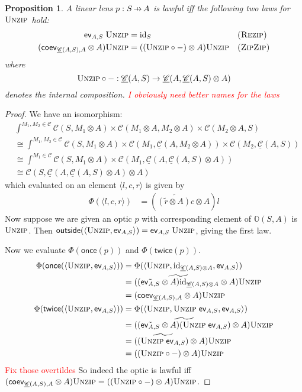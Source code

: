 \documentclass[11pt,a4paper]{article}
\theoremstyle{plain}
\newtheorem{proposition}[theorem]{Proposition}
\theoremstyle{definition}
\newcommand{\C}{\mathscr{C}}
\newcommand{\homC}{\underline{\C}}
\newcommand{\id}{\mathrm{id}}
\newcommand{\funzip}{\textsc{Unzip}}
\newcommand{\outside}{\mathsf{outside}}
\newcommand{\once}{\mathsf{once}}
\newcommand{\twice}{\mathsf{twice}}
\newcommand{\hto}{\ensuremath{\,\mathaccent\shortmid\rightarrow\,}}
\newcommand{\todo}[1]{\textcolor{red}{\small #1}}
\begin{document}
\begin{proposition}
  A linear lens $p : S \hto A$ is lawful iff the following two laws for $\funzip$ hold:
  \begin{align*}
    \ev_{A, S} \; \funzip &= \id_S && \textsc{(Rezip)} \\
    (\coev_{\homC(A, S), A} \otimes A)\funzip &= ((\funzip \circ -) \otimes A)\funzip && \textsc{(ZipZip)}
  \end{align*}
  where \[ \funzip \circ - : \homC(A, S) \to \homC(A, \homC(A, S) \otimes A) \] denotes the internal composition. \todo{I obviously need better names for the laws}
\end{proposition}
\begin{proof}
  We have an isomorphism:
  \begin{align*}
    & \int^{M_1, M_2 \in \C} \C(S, M_1 \otimes A) \times \C(M_1 \otimes A, M_2 \otimes A) \times \C(M_2 \otimes A, S) \\
    &\cong \int^{M_1, M_2 \in \C} \C(S, M_1 \otimes A) \times \C(M_1, \homC(A, M_2 \otimes A)) \times \C(M_2, \homC(A, S)) \\
    &\cong \int^{M_1 \in \C} \C(S, M_1 \otimes A) \times \C(M_1, \homC(A, \homC(A, S) \otimes A)) \\
    &\cong \C(S, \homC(A, \homC(A, S) \otimes A) \otimes A)
  \end{align*}
  which evaluated on an element $\langle l, c, r \rangle$ is given by
  \begin{align*}
    \Phi(\langle l, c, r \rangle) &= (\widetilde{(\tilde{r} \otimes A)c} \otimes A)l
  \end{align*}
  Now suppose we are given an optic $p$ with corresponding element of $\mathbb{O}(S, A)$ is $\funzip$. Then $\outside(\langle \funzip , \ev_{A, S} \rangle) = \ev_{A, S} \; \funzip$, giving the first law.

  Now we evaluate $\Phi(\once(p))$ and $\Phi(\twice(p))$.
  \begin{align*}
    \Phi(\once(\langle \funzip , \ev_{A, S} \rangle))
    &= \Phi(\langle \funzip , \id_{\homC(A,S) \otimes A}, \ev_{A, S} \rangle) \\
    &= (\widetilde{(\tilde{\ev_{A, S}} \otimes A)\id_{\homC(A,S) \otimes A}} \otimes A)\funzip \\
    &= (\coev_{\homC(A, S), A} \otimes A)\funzip \\
    \Phi(\twice(\langle \funzip , \ev_{A, S} \rangle))
    &= \Phi(\langle \funzip , \funzip \; \ev_{A, S}, \ev_{A, S} \rangle) \\
    &= (\widetilde{(\tilde{\ev_{A, S}} \otimes A)(\funzip \; \ev_{A, S})} \otimes A)\funzip \\
    &= (\widetilde{(\funzip \; \ev_{A, S})} \otimes A)\funzip \\
    &= ((\funzip \circ -) \otimes A)\funzip
  \end{align*}
  \todo{Fix those overtildes}
  So indeed the optic is lawful iff $(\coev_{\homC(A, S), A} \otimes A)\funzip = ((\funzip \circ -) \otimes A)\funzip$.
\end{proof}
\end{document}
